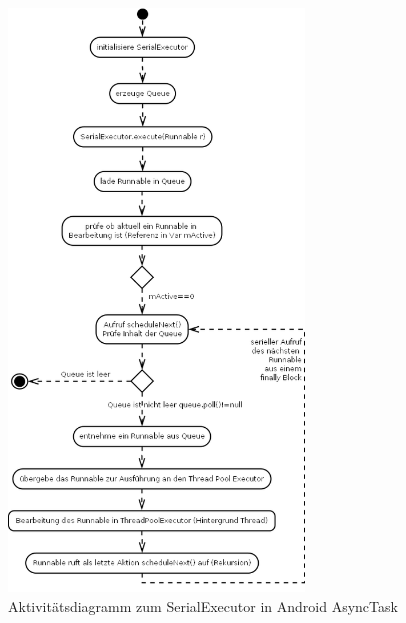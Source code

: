 \documentclass[12pt,oneside,a4paper,bibtotoc,liststotoc]{scrreprt}
\begin{document}
\begin{figure}[H]
  \begin{centering}
    \includegraphics[width=0.7\textwidth]{img/ActivitydiagrammAsyncTaskSerialExecutor.png}
    \caption{Aktivitätsdiagramm zum SerialExecutor in Android AsyncTask}
    \label{ActivitydiagrammAsyncTaskSerialExecutor}
  \end{centering}
\end{figure}
\end{document}
